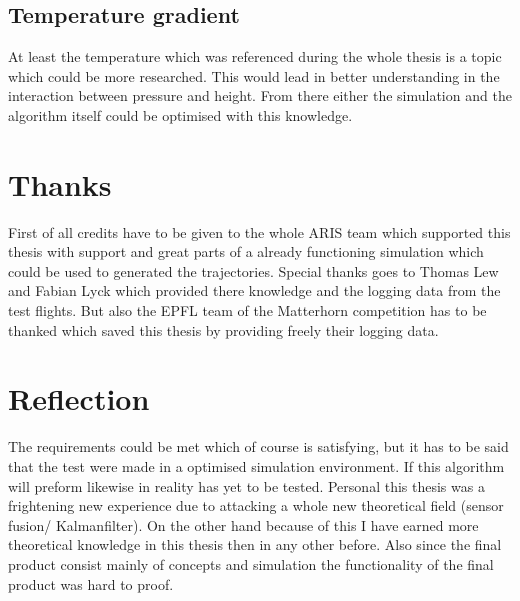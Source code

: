 \subsection{Temperature gradient}
At least the temperature which was referenced during the whole thesis is a topic which could be more researched.
This would lead in better understanding in the interaction between pressure and height.
From there either the simulation and the algorithm itself could be optimised with this knowledge.

\section{Thanks}
First of all credits have to be given to the whole ARIS team which supported this thesis with support
and great parts of a already functioning simulation which could be used to generated the trajectories.
Special thanks goes to Thomas Lew and Fabian Lyck which provided there knowledge and the logging data from the test flights.
But also the EPFL team of the Matterhorn competition has to be thanked which saved this thesis by providing freely their logging data.

\section{Reflection}
The requirements could be met which of course is satisfying, but it has to be said that the test were made in a optimised simulation environment.
If this algorithm will preform likewise in reality has yet to be tested.
Personal this thesis was a frightening new experience due to attacking a whole new theoretical field (sensor fusion/ Kalmanfilter).
On the other hand because of this I have earned more theoretical knowledge in this thesis then in any other before.
Also since the final product consist mainly of concepts and simulation the functionality of the final product was hard to proof.
